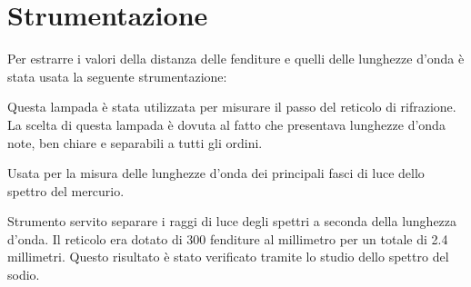 \documentclass[a4paper,10pt]{article}
\begin{document}
	
	\section{Strumentazione}
	Per estrarre i valori della distanza delle fenditure e quelli delle lunghezze d'onda è stata usata la seguente strumentazione:
	\begin{description}[align=left]
		\item [Lampada al sodio] Questa lampada è stata utilizzata per misurare il passo del reticolo di rifrazione. La scelta di questa lampada è dovuta al fatto che presentava lunghezze d'onda note, ben chiare e separabili a tutti gli ordini.
		
		\item [Lampada al mercurio] Usata per la misura delle lunghezze d'onda dei principali fasci di luce dello spettro del mercurio. 
		
		\item [Reticolo di diffrazione] Strumento servito separare i raggi di luce degli spettri a seconda della lunghezza d'onda. Il reticolo era dotato di 300 fenditure al millimetro per un totale di 2.4 millimetri. Questo risultato è stato verificato tramite lo studio dello spettro del sodio.
		

\end{description}
\end{document}
